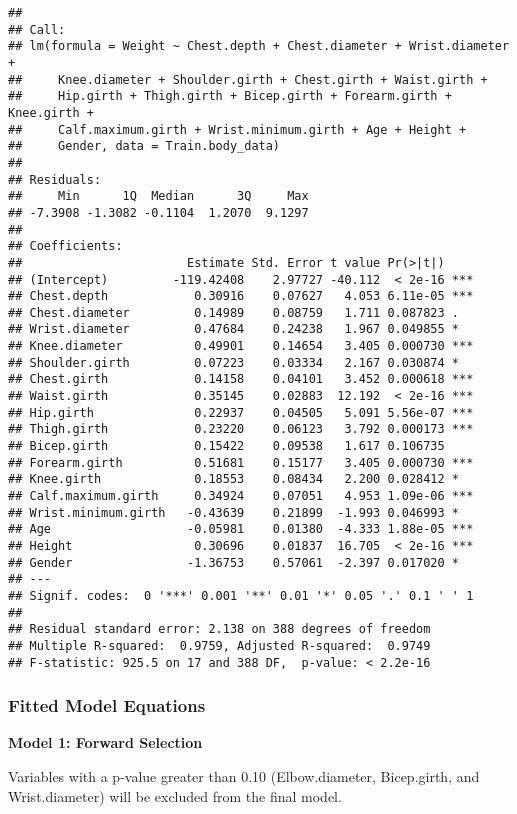 \documentclass[
]{article}
\begin{document}
\begin{verbatim}
## 
## Call:
## lm(formula = Weight ~ Chest.depth + Chest.diameter + Wrist.diameter + 
##     Knee.diameter + Shoulder.girth + Chest.girth + Waist.girth + 
##     Hip.girth + Thigh.girth + Bicep.girth + Forearm.girth + Knee.girth + 
##     Calf.maximum.girth + Wrist.minimum.girth + Age + Height + 
##     Gender, data = Train.body_data)
## 
## Residuals:
##     Min      1Q  Median      3Q     Max 
## -7.3908 -1.3082 -0.1104  1.2070  9.1297 
## 
## Coefficients:
##                       Estimate Std. Error t value Pr(>|t|)    
## (Intercept)         -119.42408    2.97727 -40.112  < 2e-16 ***
## Chest.depth            0.30916    0.07627   4.053 6.11e-05 ***
## Chest.diameter         0.14989    0.08759   1.711 0.087823 .  
## Wrist.diameter         0.47684    0.24238   1.967 0.049855 *  
## Knee.diameter          0.49901    0.14654   3.405 0.000730 ***
## Shoulder.girth         0.07223    0.03334   2.167 0.030874 *  
## Chest.girth            0.14158    0.04101   3.452 0.000618 ***
## Waist.girth            0.35145    0.02883  12.192  < 2e-16 ***
## Hip.girth              0.22937    0.04505   5.091 5.56e-07 ***
## Thigh.girth            0.23220    0.06123   3.792 0.000173 ***
## Bicep.girth            0.15422    0.09538   1.617 0.106735    
## Forearm.girth          0.51681    0.15177   3.405 0.000730 ***
## Knee.girth             0.18553    0.08434   2.200 0.028412 *  
## Calf.maximum.girth     0.34924    0.07051   4.953 1.09e-06 ***
## Wrist.minimum.girth   -0.43639    0.21899  -1.993 0.046993 *  
## Age                   -0.05981    0.01380  -4.333 1.88e-05 ***
## Height                 0.30696    0.01837  16.705  < 2e-16 ***
## Gender                -1.36753    0.57061  -2.397 0.017020 *  
## ---
## Signif. codes:  0 '***' 0.001 '**' 0.01 '*' 0.05 '.' 0.1 ' ' 1
## 
## Residual standard error: 2.138 on 388 degrees of freedom
## Multiple R-squared:  0.9759, Adjusted R-squared:  0.9749 
## F-statistic: 925.5 on 17 and 388 DF,  p-value: < 2.2e-16
\end{verbatim}

\hypertarget{fitted-model-equations}{%
\subsubsection{Fitted Model Equations}\label{fitted-model-equations}}

\textbf{Model 1: Forward Selection}

Variables with a p-value greater than 0.10 (Elbow.diameter, Bicep.girth,
and Wrist.diameter) will be excluded from the final model.
\end{document}
